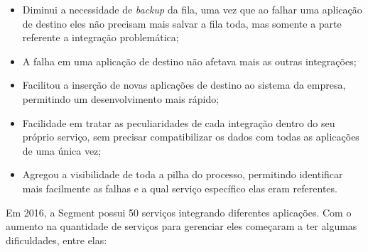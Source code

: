 \begin{itemize}
    \item Diminui a necessidade de \textit{backup} da fila, uma vez que ao falhar uma aplicação de
        destino eles não precisam mais salvar a fila toda, mas somente a parte referente a
        integração problemática;
    \item A falha em uma aplicação de destino não afetava mais as outras integrações;
    \item Facilitou a inserção de novas aplicações de destino ao sistema da empresa, permitindo um
        desenvolvimento mais rápido;
    \item Facilidade em tratar as peculiaridades de cada integração dentro do seu próprio serviço,
        sem precisar compatibilizar os dados com todas as aplicações de uma única vez;
    \item Agregou a visibilidade de toda a pilha do processo, permitindo identificar mais facilmente
        as falhas e a qual serviço específico elas eram referentes.
\end{itemize}

Em 2016, a Segment possui 50 serviços integrando diferentes aplicações. Com o aumento na quantidade
de serviços para gerenciar eles começaram a ter algumas dificuldades, entre elas:

